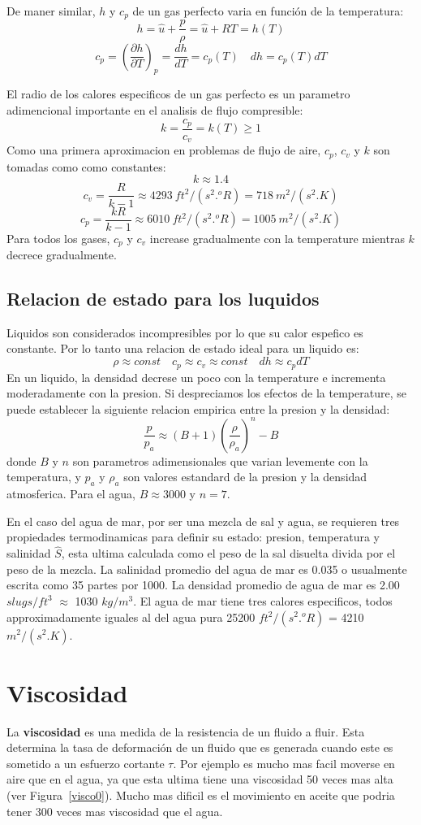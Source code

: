 \documentclass[10pt, oneside]{article}
\begin{document}
De maner similar, $h$ y $c_p$ de un gas perfecto varia en funci\'on de la temperatura:
$$
h=\hat{u} + \frac{p}{\rho}=\hat{u}+RT=h(T)
$$
$$
c_p=\left( \frac{\partial h}{\partial T}\right)_{p} = \frac{d h}{dT}=c_p (T) \quad dh = c_p (T)dT
$$

El radio de los calores especificos de un gas perfecto es un parametro adimencional importante en el analisis de flujo compresible:
$$
k = \frac{c_p}{c_v}=k(T) \geq 1
$$
Como una primera aproximacion en problemas de flujo de aire, $c_p$, $c_v$ y $k$ son tomadas como como constantes:
$$
k\approx 1.4
$$
$$
c_v = \frac{R}{k-1} \approx 4293\ ft^2/(s^2 . ^oR) = 718\ m^2/(s^2 . K)
$$
$$
c_p = \frac{kR}{k-1} \approx 6010\ ft^2/(s^2 . ^oR) = 1005\ m^2/(s^2 . K)
$$
Para todos los gases, $c_p$ y $c_v$ increase gradualmente con la temperature mientras $k$ decrece gradualmente. 

\subsection{Relacion de estado para los luquidos}
Liquidos son considerados incompresibles por lo que su calor espefico es constante. Por lo tanto una relacion de estado ideal para un liquido es:
$$
\rho \approx const \quad c_p \approx c_v \approx const  \quad dh\approx c_p dT
$$
En un liquido, la densidad decrese un poco con la temperature e incrementa moderadamente con la presion. Si despreciamos los efectos de la temperature, se puede establecer la siguiente relacion empirica entre la presion y la densidad:
$$
\frac{p}{p_a}\approx (B+1) \left( \frac{\rho}{\rho_a} \right)^n - B
$$
donde $B$ y $n$ son parametros adimensionales que varian levemente con la temperatura, y $p_a$ y $\rho_a$ son valores estandard de la presion y la densidad atmosferica. Para el agua, $B\approx3000$ y $n=7$.

En el caso del agua de mar, por ser una mezcla de sal y agua, se requieren tres propiedades termodinamicas para definir su estado: presion, temperatura y salinidad $\hat{S}$, esta ultima calculada como el peso de la sal disuelta divida por el peso de la mezcla. La salinidad promedio del agua de mar es 0.035 o usualmente escrita como 35 partes por 1000. La densidad promedio de agua de mar es 2.00 $slugs/ft^3$ $\approx$ 1030 $kg/m^3$. El agua de mar tiene tres calores especificos, todos approximadamente iguales al del agua pura 25200 $ft^2/(s^2. ^oR)$ = 4210 $m^2/(s^2. K)$.

\section{Viscosidad}
La \textbf{viscosidad} es una medida de la resistencia de un fluido a fluir. Esta determina la tasa de deformaci\'on de un fluido que es generada cuando este es sometido a un esfuerzo cortante $\tau$. Por ejemplo es mucho mas facil moverse en aire que en el agua, ya que esta ultima tiene una viscosidad 50 veces mas alta (ver Figura~\ref{visco0}). Mucho mas dificil es el movimiento en aceite que podria tener 300 veces mas viscosidad que el agua. 
\end{document}
